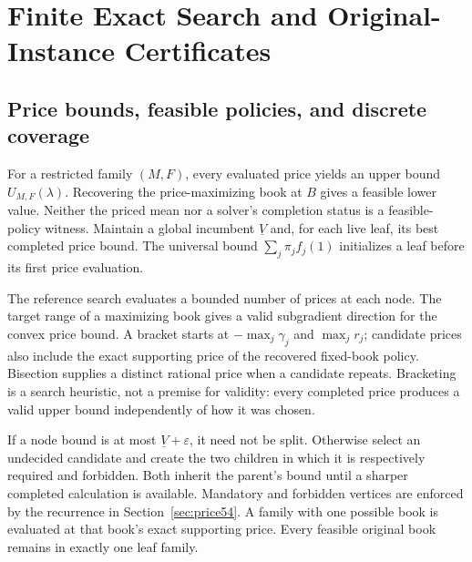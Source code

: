 \section{Finite Exact Search and Original-Instance Certificates}\label{sec:branch54}
\subsection{Price bounds, feasible policies, and discrete coverage}
For a restricted family $(M,F)$, every evaluated price yields an upper bound $U_{M,F}(\lambda)$. Recovering the price-maximizing book at $B$ gives a feasible lower value. Neither the priced mean nor a solver's completion status is a feasible-policy witness. Maintain a global incumbent $\underline V$ and, for each live leaf, its best completed price bound. The universal bound $\sum_j\pi_jf_j(1)$ initializes a leaf before its first price evaluation.

The reference search evaluates a bounded number of prices at each node. The target range of a maximizing book gives a valid subgradient direction for the convex price bound. A bracket starts at $-\max_j\gamma_j$ and $\max_jr_j$; candidate prices also include the exact supporting price of the recovered fixed-book policy. Bisection supplies a distinct rational price when a candidate repeats. Bracketing is a search heuristic, not a premise for validity: every completed price produces a valid upper bound independently of how it was chosen.

If a node bound is at most $\underline V+\varepsilon$, it need not be split. Otherwise select an undecided candidate and create the two children in which it is respectively required and forbidden. Both inherit the parent's bound until a sharper completed calculation is available. Mandatory and forbidden vertices are enforced by the recurrence in Section~\ref{sec:price54}. A family with one possible book is evaluated at that book's exact supporting price. Every feasible original book remains in exactly one leaf family.

